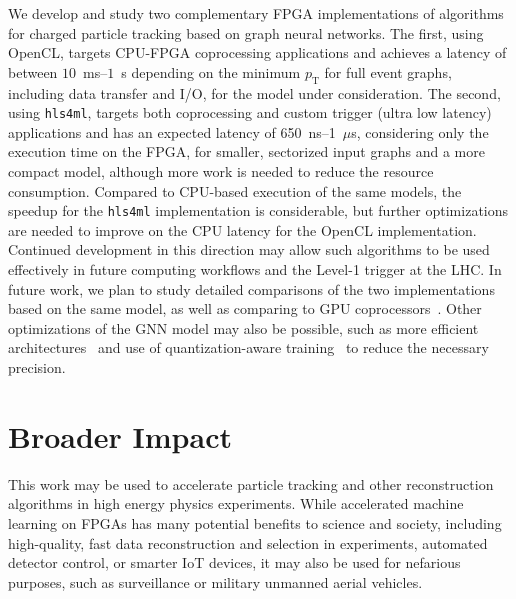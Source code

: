 \documentclass{article}
\newcommand{\hlsfml}{\texttt{hls4ml}\xspace}
\newcommand{\pt}{\ensuremath{p_{\mathrm{T}}}\xspace}
\begin{document}
We develop and study two complementary FPGA implementations of algorithms for charged particle tracking based on graph neural networks. 
The first, using OpenCL, targets CPU-FPGA coprocessing applications and achieves a latency of between $10$~ms--$1$~s depending on the minimum $\pt$ for full event graphs, including data transfer and I/O, for the model under consideration.
The second, using \hlsfml, targets both coprocessing and custom trigger (ultra low latency) applications and has an expected latency of 650~ns--1~$\mu$s, considering only the execution time on the FPGA, for smaller, sectorized input graphs and a more compact model, although more work is needed to reduce the resource consumption.
Compared to CPU-based execution of the same models, the speedup for the \hlsfml implementation is considerable, but further optimizations are needed to improve on the CPU latency for the OpenCL implementation.
Continued development in this direction may allow such algorithms to be used effectively in future computing workflows and the Level-1 trigger at the LHC.
In future work, we plan to study detailed comparisons of the two implementations based on the same model, as well as comparing to GPU coprocessors~\cite{Krupa:2020bwg}.
Other optimizations of the GNN model may also be possible, such as more efficient architectures~\cite{Iiyama:2020wap} and use of quantization-aware training~\cite{DiGuglielmo:2020eqx,Coelho:2020zfu} to reduce the necessary precision.

\section*{Broader Impact}

This work may be used to accelerate particle tracking and other reconstruction algorithms in high energy physics experiments.
While accelerated machine learning on FPGAs has many potential benefits to science and society, including high-quality, fast data reconstruction and selection in experiments, automated detector control, or smarter IoT devices, it may also be used for nefarious purposes, such as surveillance or military unmanned aerial vehicles.
\end{document}
